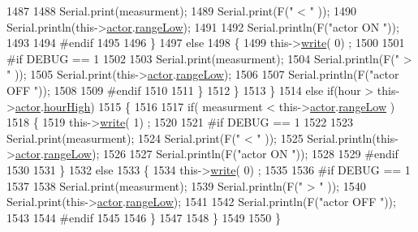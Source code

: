 \begin{DoxyCode}
1487 
1488                 Serial.print(measurment);
1489                 Serial.print(F(\textcolor{stringliteral}{" < "} ));
1490                 Serial.println(this->\hyperlink{class_cool_board_actor_a8f190db9f7a39fddbcef7f152da970e9}{actor}.\hyperlink{struct_cool_board_actor_1_1state_a43f891c9fb3bb63575c27cec860de55a}{rangeLow});
1491 
1492                 Serial.println(F(\textcolor{stringliteral}{"actor ON "}));
1493 
1494 \textcolor{preprocessor}{            #endif  }
1495 
1496             \}
1497             \textcolor{keywordflow}{else} 
1498             \{
1499                 this->\hyperlink{class_cool_board_actor_a958786ff01ea1056ee72c72d439f86da}{write}( 0) ;
1500 
1501 \textcolor{preprocessor}{            #if DEBUG == 1 }
1502 
1503                 Serial.print(measurment);
1504                 Serial.println(F(\textcolor{stringliteral}{" > "} ));
1505                 Serial.print(this->\hyperlink{class_cool_board_actor_a8f190db9f7a39fddbcef7f152da970e9}{actor}.\hyperlink{struct_cool_board_actor_1_1state_a43f891c9fb3bb63575c27cec860de55a}{rangeLow});
1506 
1507                 Serial.println(F(\textcolor{stringliteral}{"actor OFF "}));
1508 
1509 \textcolor{preprocessor}{            #endif  }
1510                 
1511             \}
1512         \}
1513     \}
1514     \textcolor{keywordflow}{else} \textcolor{keywordflow}{if}(hour > this->\hyperlink{class_cool_board_actor_a8f190db9f7a39fddbcef7f152da970e9}{actor}.\hyperlink{struct_cool_board_actor_1_1state_acd1af3ac2382258a5b05497d814adc01}{hourHigh})
1515     \{
1516 
1517         \textcolor{keywordflow}{if}( measurment < this->\hyperlink{class_cool_board_actor_a8f190db9f7a39fddbcef7f152da970e9}{actor}.\hyperlink{struct_cool_board_actor_1_1state_a43f891c9fb3bb63575c27cec860de55a}{rangeLow} )
1518         \{
1519             this->\hyperlink{class_cool_board_actor_a958786ff01ea1056ee72c72d439f86da}{write}( 1) ;
1520 
1521 \textcolor{preprocessor}{        #if DEBUG == 1 }
1522 
1523             Serial.print(measurment);
1524             Serial.print(F(\textcolor{stringliteral}{" < "} ));
1525             Serial.println(this->\hyperlink{class_cool_board_actor_a8f190db9f7a39fddbcef7f152da970e9}{actor}.\hyperlink{struct_cool_board_actor_1_1state_a43f891c9fb3bb63575c27cec860de55a}{rangeLow});
1526 
1527             Serial.println(F(\textcolor{stringliteral}{"actor ON "}));
1528 
1529 \textcolor{preprocessor}{        #endif  }
1530 
1531         \}
1532         \textcolor{keywordflow}{else} 
1533         \{
1534             this->\hyperlink{class_cool_board_actor_a958786ff01ea1056ee72c72d439f86da}{write}( 0) ;
1535 
1536 \textcolor{preprocessor}{        #if DEBUG == 1 }
1537 
1538             Serial.print(measurment);
1539             Serial.println(F(\textcolor{stringliteral}{" > "} ));
1540             Serial.print(this->\hyperlink{class_cool_board_actor_a8f190db9f7a39fddbcef7f152da970e9}{actor}.\hyperlink{struct_cool_board_actor_1_1state_a43f891c9fb3bb63575c27cec860de55a}{rangeLow});
1541 
1542             Serial.println(F(\textcolor{stringliteral}{"actor OFF "}));
1543 
1544 \textcolor{preprocessor}{        #endif  }
1545             
1546         \}
1547     
1548     \}
1549 
1550 \}
\end{DoxyCode}
